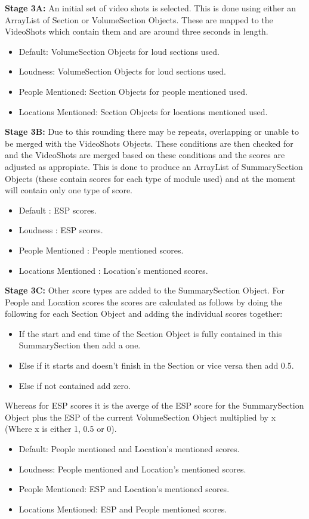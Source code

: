 \textbf{Stage 3A:} An initial set of video shots is selected. This is done using either an ArrayList of Section or VolumeSection 
Objects. These are mapped to the VideoShots which contain them and are around three seconds in length.
\begin{itemize}
	\item{Default: VolumeSection Objects for loud sections used.}
	\item{Loudness: VolumeSection Objects for loud sections used.}
	\item{People Mentioned: Section Objects for people mentioned used.}
	\item{Locations Mentioned: Section Objects for locations mentioned used.}
\end{itemize}

\textbf{Stage 3B:} Due to this rounding there may be repeats, overlapping or unable to be merged with the VideoShots Objects. 
These conditions are then checked for and the VideoShots are merged based on these conditions and the scores are adjusted as appropiate. This is done to produce an ArrayList of SummarySection Objects (these contain scores for each type of module used) and at the moment will contain only one type of score.

\begin{itemize}
	\item{Default : ESP scores.}
	\item{Loudness : ESP scores.}
	\item{People Mentioned :  People mentioned scores.}
	\item{Locations Mentioned : Location's mentioned scores.}
\end{itemize}

\textbf{Stage 3C:} Other score types are added to the SummarySection Object. For People and Location scores the scores are calculated as follows 
by doing the following for each Section Object and adding the individual scores together:

\begin{itemize}
	\item{If the start and end time of the Section Object is fully contained in this SummarySection then add a one.}
	\item{Else if it starts and doesn’t finish in the Section or vice versa then add 0.5.}
	\item{Else if not contained add zero.}
\end{itemize}

Whereas for ESP scores it is the averge of the ESP score for the SummarySection Object plus the ESP of the current VolumeSection Object multiplied by x (Where x is either 1, 0.5 or 0). 
\begin{itemize}
	\item{Default: People mentioned and Location's mentioned scores.}
	\item{Loudness: People mentioned and Location's mentioned scores.}
	\item{People Mentioned: ESP and Location's mentioned scores.}
	\item{Locations Mentioned: ESP and People mentioned scores.}
\end{itemize}

